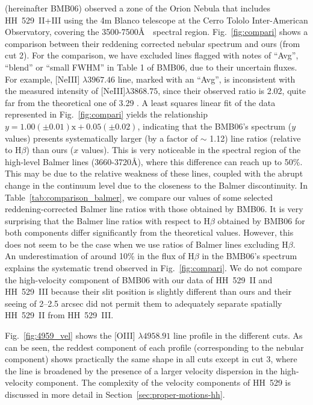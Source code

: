 \documentclass[fleqn,usenatbib]{mnras}
\begin{document}
\citet{Blagrave06} (hereinafter BMB06) observed a zone of the Orion Nebula that includes HH~529~II+III using the 4m Blanco telescope at the Cerro Tololo Inter-American Observatory, covering the 3500-7500\AA$\text{ }$ spectral region. Fig.~\ref{fig:compari} shows a comparison between their reddening corrected nebular spectrum and ours (from cut 2). For the comparison, we have excluded lines flagged with notes of ``Avg'', ``blend'' or ``small FWHM'' in Table 1 of BMB06, due to their uncertain fluxes. For example, [Ne\thinspace III] $\lambda 3967.46$ line, marked with an ``Avg'', is inconsistent with the measured intensity of [Ne\thinspace III]$\lambda 3868.75$, since their observed ratio is 2.02, quite far from the theoretical one of 3.29 \citep{McLaughlin11}. A least squares linear fit of the data represented in Fig.~\ref{fig:compari} yields the relationship $y = 1.00\left( \pm 0.01 \right)\text{x} + 0.05\left(\pm 0.02\right)$, indicating that the BMB06's spectrum ($y$ values) presents systematically larger (by a factor of $\sim$ 1.12) line ratios (relative to H$\beta$) than ours ($x$ values). This is very noticeable in the spectral region of the high-level Balmer lines (3660-3720\AA), where this difference can reach up to 50\%. This may be due to the relative weakness of these lines, coupled with the abrupt change in the continuum level due to the closeness to the Balmer discontinuity. In Table~\ref{tab:comparison_balmer}, we compare our values of some selected reddening-corrected Balmer line ratios with those obtained by BMB06. It is very surprising that the Balmer line ratios with respect to H$\beta$ obtained by BMB06 for both components differ significantly from the theoretical values. However, this does not seem to be the case when we use ratios of Balmer lines excluding H$\beta$. An underestimation of around 10\% in the flux of H$\beta$ in the BMB06's spectrum explains the systematic trend observed in Fig.~\ref{fig:compari}. We do not compare the high-velocity component of BMB06 with our data of HH~529~II and HH~529~III because their slit position is slightly different than ours and their seeing of 2--2.5 arcsec did not permit them to adequately separate spatially HH~529~II from HH~529~III.



Fig.~\ref{fig:4959_vel} shows the [O\thinspace III] $\lambda 4958.91$ line profile in the different cuts. As can be seen, the reddest component of each profile (corresponding to the nebular component) shows practically the same shape in all cuts except in cut 3, where the line is broadened by the presence of a larger velocity dispersion in the high-velocity component. The complexity of the velocity components of HH~529 is discussed in more detail in Section~\ref{sec:proper-motions-hh}.
\end{document}
